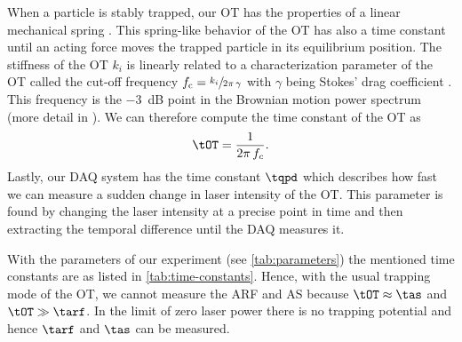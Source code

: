 When a particle is stably trapped, our OT has the properties of a linear 
mechanical spring \cite{Lamprecht2016}. This spring-like behavior of the OT has 
also a time constant until an acting force moves the trapped particle in its 
equilibrium position. The stiffness of the OT $k_{i}$ is linearly related to a 
characterization parameter of the OT called the cut-off frequency $f_{\text{c}} 
= \sfrac{k_{i}}{2\pi\,\gamma}$ with $\gamma$ being Stokes' drag coefficient 
\cite{Lamprecht2016,Lamprecht2017}. This frequency is the \SI{-3}{\dB} point 
in the Brownian motion power spectrum (more detail in 
\cite{Lakaemper2015,Lamprecht2016}). We can therefore compute the time 
constant of the OT as
\begin{equation}
  \tOT = \frac{1}{2\pi\,f_{c}}.
  \label{eq:tau-OT}
\end{equation}
Lastly, our DAQ system has the time constant $\tqpd$ which describes how fast we 
can measure a sudden change in laser intensity of the OT. This parameter is 
found by changing the laser intensity at a precise point in time and then 
extracting the temporal difference until the DAQ measures it. 

With the parameters of our experiment (see \cref{tab:parameters}) the mentioned 
time constants are as listed in \cref{tab:time-constants}. Hence, with the 
usual trapping mode of the OT, we cannot measure the ARF and AS because $\tOT 
\approx \tas$ and $\tOT\gg\tarf$. In the limit of zero laser power there is no 
trapping potential and hence $\tarf$ and $\tas$ can be measured.


